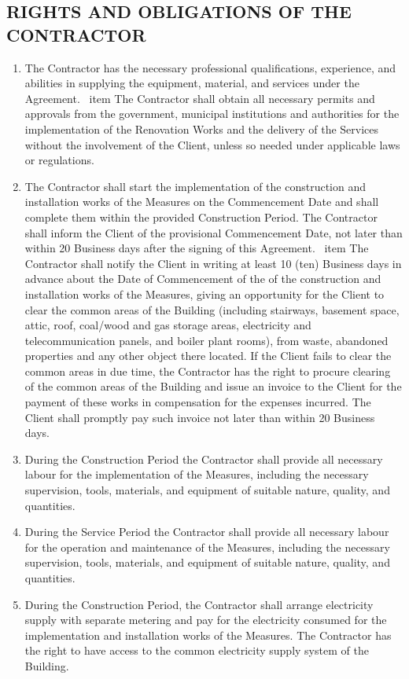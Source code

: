 \begin{multicols}{2}
\subsection{RIGHTS AND OBLIGATIONS OF THE CONTRACTOR}
\begin{enumerate}
        \item The Contractor has the necessary professional qualifications, experience, and abilities in supplying the equipment, material, and services under the Agreement.
        \ item The Contractor shall obtain all necessary permits and approvals from the government, municipal institutions and authorities for the implementation of the Renovation Works and the delivery of the Services without the involvement of the Client, unless so needed under applicable laws or regulations.
	\item The Contractor shall start the implementation of the construction and installation works of the Measures on the Commencement Date and shall complete them within the provided Construction Period. The Contractor shall inform the Client of the provisional Commencement Date, not later than within 20 Business days after the signing of this Agreement.
	\ item The Contractor shall notify the Client in writing at least 10 (ten) Business days in advance about the Date of Commencement of the of the construction and installation works of the Measures, giving an opportunity for the Client to clear the common areas of the Building (including stairways, basement space, attic, roof, coal/wood and gas storage areas, electricity and telecommunication panels, and boiler plant rooms), from waste, abandoned properties and any other object there located. If the Client fails to clear the common areas in due time, the Contractor has the right to procure clearing of the common areas of the Building and issue an invoice to the Client for the payment of these works in compensation for the expenses incurred. The Client shall promptly pay such invoice not later than within 20 Business days.
	\item During the Construction Period the Contractor shall provide all necessary labour for the implementation of the Measures, including the necessary supervision, tools, materials, and equipment of suitable nature, quality, and quantities.
	\item During the Service Period the Contractor shall provide all necessary labour for the operation and maintenance of the Measures, including the necessary supervision, tools, materials, and equipment of suitable nature, quality, and quantities.
	\item During the Construction Period, the Contractor shall arrange electricity supply with separate metering and pay for the electricity consumed for the implementation and installation works of the Measures. The Contractor has the right to have access to the common electricity supply system of the Building.

\end{enumerate}
\end{multicols}
